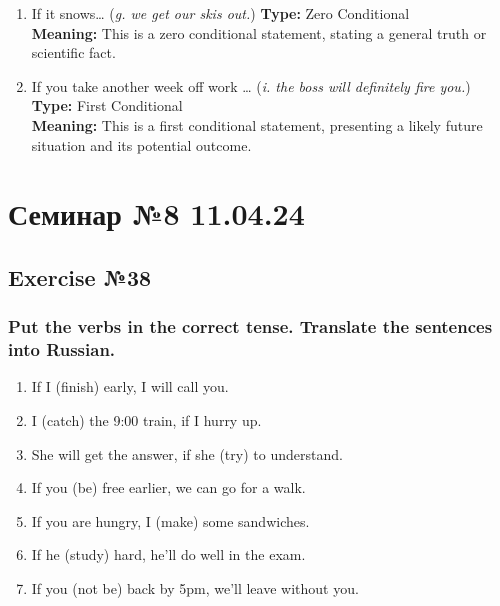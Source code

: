 \begin{enumerate}
      \item If it snows… (\textit{g. we get our skis out.})
            \textbf{Type:} Zero Conditional \\
            \textbf{Meaning:} This is a zero conditional statement, stating a general truth or scientific fact.

      \item If you take another week off work … (\textit{i. the boss will definitely fire you.})
            \textbf{Type:} First Conditional \\
            \textbf{Meaning:} This is a first conditional statement, presenting a likely future situation and its potential outcome.
\end{enumerate}

\chapter{Семинар №8 11.04.24}

\section{Exercise №38}
\subsection*{Put the verbs in the correct tense. Translate the sentences into Russian.}

\begin{enumerate}
      \item If I \underline{\hspace{2cm}} (finish) early, I will call you.
      \item I \underline{\hspace{2cm}} (catch) the 9:00 train, if I hurry up.
      \item She will get the answer, if she \underline{\hspace{2cm}} (try) to understand.
      \item If you \underline{\hspace{2cm}} (be) free earlier, we can go for a walk.
      \item If you are hungry, I \underline{\hspace{2cm}} (make) some sandwiches.
      \item If he \underline{\hspace{2cm}} (study) hard, he’ll do well in the exam.
      \item If you \underline{\hspace{2cm}} (not be) back by 5pm, we’ll leave without you.
\end{enumerate}

